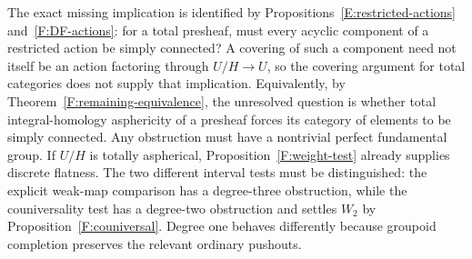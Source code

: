 The exact missing implication is identified by
Propositions~\ref{E:restricted-actions} and~\ref{F:DF-actions}:
for a total presheaf, must every acyclic component of a
restricted action be simply connected? A covering of such
a component need not itself be an action factoring through
$U/H\to U$, so the covering argument for total categories
does not supply that implication. Equivalently, by
Theorem~\ref{F:remaining-equivalence}, the unresolved question
is whether total integral-homology asphericity of a presheaf
forces its category of elements to be simply connected.
Any obstruction must have a nontrivial perfect fundamental
group. If $U/H$ is totally aspherical,
Proposition~\ref{F:weight-test} already supplies discrete
flatness. The two different interval tests
must be distinguished: the explicit weak-map
comparison has a degree-three obstruction, while
the couniversality test has a degree-two
obstruction and settles $W_2$ by
Proposition~\ref{F:couniversal}. Degree one
behaves differently because groupoid completion
preserves the relevant ordinary pushouts.

